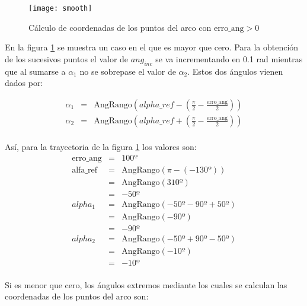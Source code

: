 \begin{figure}[bt]
  \centering\texttt{[image: smooth]}\\
  \caption{Cálculo de coordenadas de los puntos del arco con 
  $\mbox{erro\_ang} > 0$}\label{fg:smooth}
\end{figure}

En la figura \ref{fg:smooth} se muestra un caso en el que  es mayor que cero. Para la obtención de los sucesivos puntos el valor de $ang_{inc}$ se va incrementando en 0.1 rad mientras que al sumarse a $\alpha_{1}$ no se sobrepase el valor de $\alpha_{2}$. Estos dos ángulos vienen dados por:

\begin{eqnarray*}
\alpha_{1}  & = & \mbox{AngRango} \left ( alpha\_ref - 
   \left (\frac{\pi}{2} - \frac{\mbox{erro\_ang}}{2} \right ) \right )\\
 \alpha_{2}  & = & \mbox{AngRango} \left ( alpha\_ref + 
   \left (\frac{\pi}{2} - \frac{\mbox{erro\_ang}}{2} \right ) \right )\\
\end{eqnarray*}

Así, para la trayectoria de la figura \ref{fg:smooth} los valores son:
\begin{eqnarray*}
\mbox{erro\_ang}  & = & 100º \\
\mbox{alfa\_ref}     &=  & \mbox{AngRango} (\pi - (-130º))\\
                                  & = &\mbox{AngRango} (310º) \\
                                  & = & -50º\\
alpha_{1}                &= & \mbox{AngRango} (-50º - 90º + 50º)\\ 
                                 & = & \mbox{AngRango} (-90º)\\
                                 & = & -90º\\ 
alpha_{2}                &= & \mbox{AngRango} (-50º + 90º - 50º)\\ 
                                 & = & \mbox{AngRango} (-10º)\\
                                 & = & -10º\\                             
\end{eqnarray*}



Si  es menor que cero, los ángulos extremos mediante los cuales se calculan las coordenadas de los puntos del arco son:

